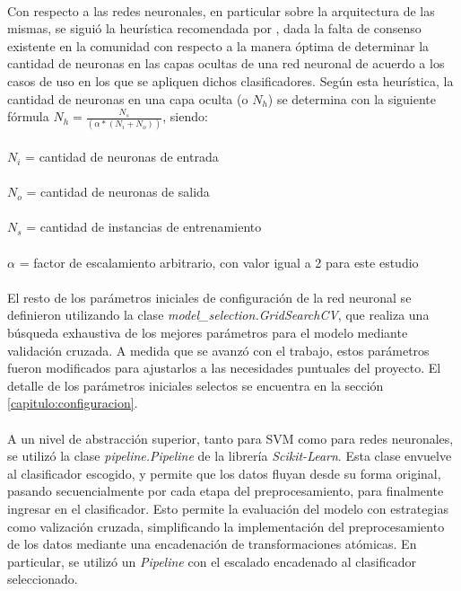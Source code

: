 \paragraph{} Con respecto a las redes neuronales, en particular sobre la arquitectura de las mismas, se siguió la heurística recomendada por \citet{bib-heuristic-hobs}, dada la falta de consenso existente en la comunidad con respecto a la manera óptima de determinar la cantidad de neuronas en las capas ocultas de una red neuronal de acuerdo a los casos de uso en los que se apliquen dichos clasificadores. Según esta heurística, la cantidad de neuronas en una capa oculta (o $N_h$) se determina con la siguiente fórmula $N_h = \frac{N_s} {(\alpha * (N_i + N_o))}$, siendo:
\\
\\
$N_i$ = cantidad de neuronas de entrada
\\
\\
$N_o$ = cantidad de neuronas de salida
\\
\\
$N_s$ = cantidad de instancias de entrenamiento
\\
\\
$\alpha$ = factor de escalamiento arbitrario, con valor igual a 2 para este estudio

\paragraph{} El resto de los parámetros iniciales de configuración de la red neuronal se definieron utilizando la clase \textit{model\_selection.GridSearchCV}, que realiza una búsqueda exhaustiva de los mejores parámetros para el modelo mediante validación cruzada. A medida que se avanzó con el trabajo, estos parámetros fueron modificados para ajustarlos a las necesidades puntuales del proyecto. El detalle de los parámetros iniciales selectos se encuentra en la sección \ref{capitulo:configuracion}.

\paragraph{} A un nivel de abstracción superior, tanto para SVM como para redes neuronales, se utilizó la clase \textit{pipeline.Pipeline}\cite{Pipeline-scikit-learn} de la librería \textit{Scikit-Learn}. Esta clase envuelve al clasificador escogido, y permite que los datos fluyan desde su forma original, pasando secuencialmente por cada etapa del preprocesamiento, para finalmente ingresar en el clasificador. Esto permite la evaluación del modelo con estrategias como valización cruzada, simplificando la implementación del preprocesamiento de los datos mediante una encadenación de transformaciones atómicas. En particular, se utilizó un \textit{Pipeline} con el escalado encadenado al clasificador seleccionado. 

